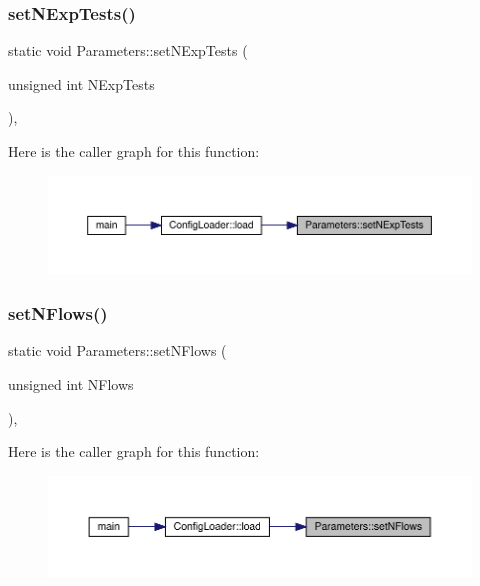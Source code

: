 \subsubsection{\texorpdfstring{setNExpTests()}{setNExpTests()}}
{\footnotesize\ttfamily static void Parameters\+::set\+N\+Exp\+Tests (\begin{DoxyParamCaption}\item[{unsigned int}]{N\+Exp\+Tests }\end{DoxyParamCaption})\hspace{0.3cm}{\ttfamily [inline]}, {\ttfamily [static]}}

Here is the caller graph for this function\+:\nopagebreak
\begin{figure}[H]
\begin{center}
\leavevmode
\includegraphics[width=350pt]{class_parameters_a5cbf802e3e5db24cf0b8afc3f39f0830_icgraph}
\end{center}
\end{figure}
\mbox{\label{class_parameters_ae9bb965e9bfa37365c5b5ef83e95f97d}} 
\subsubsection{\texorpdfstring{setNFlows()}{setNFlows()}}
{\footnotesize\ttfamily static void Parameters\+::set\+N\+Flows (\begin{DoxyParamCaption}\item[{unsigned int}]{N\+Flows }\end{DoxyParamCaption})\hspace{0.3cm}{\ttfamily [inline]}, {\ttfamily [static]}}

Here is the caller graph for this function\+:\nopagebreak
\begin{figure}[H]
\begin{center}
\leavevmode
\includegraphics[width=350pt]{class_parameters_ae9bb965e9bfa37365c5b5ef83e95f97d_icgraph}
\end{center}
\end{figure}
\mbox{\label{class_parameters_a24bd9c86cda80898bc65b950983b6a17}} 
